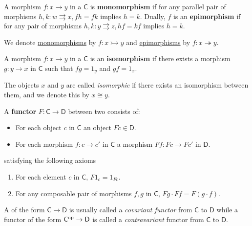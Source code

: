 \documentclass[../main.tex]{subfiles}
\begin{document}
\begin{definition} \label{def:mono-epi-morphism}
  A morphism \(f: x \to y\) in a  \(\mathsf{C}\) is \textbf{monomorphism} if for any parallel pair of morphisms \(h, k: w \rightrightarrows x, fh = fk\) implies \(h = k\).
  Dually, \(f\) is an \textbf{epimorphism} if for any pair of morphisms \(h, k: y \rightrightarrows z, hf = kf\) implies \(h = k\).
\end{definition}

\begin{notation}
  We denote \hyperref[def:mono-epi-morphism]{monomorphisms} by \(f: x \rightarrowtail y\) and \hyperref[def:mono-epi-morphism]{epimorphisms} by \(f: x \twoheadrightarrow y\).
\end{notation}


\begin{definition}[Isomorphism] \label{def:categorical-isomorphism}
  A morphism \(f: x \to y\) in a  \(\mathsf{C}\) is an \textbf{isomorphism} if there exists a morphism \(g: y \to x\) in \(\mathsf{C}\) such that \(fg = 1_{y}\) and \(gf = 1_{x}\).

  The objects \(x\) and \(y\) are called \textit{isomorphic} if there exists an isomorphism between them, and we denote this by \(x \cong y\).
\end{definition}

\begin{definition}[Functor] \label{def:functor}
  A \textbf{functor} \(F: \mathsf{C} \to \mathsf{D}\) between two  consists of:
  \begin{itemize}
    \item For each object \(c\) in \(\mathsf{C}\) an object \(Fc \in \mathsf{D}\).
    \item For each morphism \(f: c \to c'\) in \(\mathsf{C}\) a morphism \(Ff: Fc \to Fc'\) in \(\mathsf{D}\).
  \end{itemize}
  satisfying the following axioms
  \begin{enumerate}
    \item For each element \(c\) in \(\mathsf{C}\), \(F 1_{c} = 1_{Fc}\).
    \item For any composable pair of morphisms \(f, g\) in \(\mathsf{C}\), \(Fg \cdot Ff = F(g \cdot f)\).
  \end{enumerate}
\end{definition}

\begin{notation}
  A  of the form \(\mathsf{C} \to \mathsf{D}\) is usually called a \textit{covariant functor} from \(\mathsf{C}\) to \(\mathsf{D}\) while a functor of the form \(\mathsf{C}^{\operatorname*{op}} \to \mathsf{D}\) is called a \textit{contravariant} functor from \(\mathsf{C}\) to \(\mathsf{D}\).
\end{notation}
\end{document}
